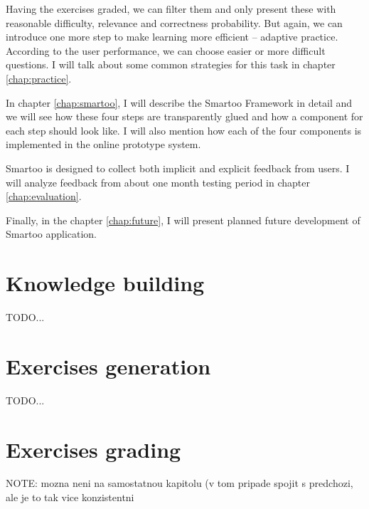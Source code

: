 \documentclass[a4paper, 12pt, twoside]{fithesis2}		%
\renewcommand{\_}{\leavevmode \kern0.0em\vbox{\hrule width0.4em}}
\begin{document}
Having the exercises graded, we can filter them and only present these with reasonable difficulty, relevance and correctness probability.
But again, we can introduce one more step to make learning more efficient -- adaptive practice.
According to the user performance, we can choose easier or more difficult questions. I will talk about some common strategies for this task in chapter \ref{chap:practice}.

In chapter \ref{chap:smartoo}, I will describe the Smartoo Framework in detail
and we will see how these four steps are transparently glued and how a component for each step should look like.
I will also mention how each of the four components is implemented in the online prototype system.

Smartoo is designed to collect both implicit and explicit feedback from users.
I will analyze feedback from about one month testing period in chapter \ref{chap:evaluation}.

Finally, in the chapter \ref{chap:future}, I will present planned future development of Smartoo application.




\chapter{Knowledge building}
\label{chap:knowledge}

TODO...

\chapter{Exercises generation}
\label{chap:exercises}

TODO...

\chapter{Exercises grading}
\label{chap:exercises-grading}

NOTE: mozna neni na samostatnou kapitolu (v tom pripade spojit s predchozi, ale je to tak vice konzistentni
\end{document}
